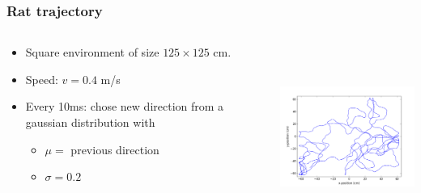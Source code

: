 \documentclass[mathserif]{beamer}
\begin{document}
%
\begin{frame}
\frametitle{Rat trajectory}
  \begin{columns}[T]
    \begin{column}{.5\textwidth}
			\begin{itemize}
		    \item Square environment of size $125 \times 125$ cm.
		    \item Speed: $v=0.4$ m/s
		    \item Every 10ms: chose new direction from a gaussian distribution with 
		    	\begin{itemize}
		    	\item $\mu=$ previous direction
		    	\item $\sigma= 0.2$
		    	\end{itemize}
		    \end{itemize}
    \end{column}
    \begin{column}{.5\textwidth}
    \includegraphics[width=6cm, height=6cm]{pics/running_rat.png}
    \end{column}
  \end{columns}
\end{frame}



\end{document}
